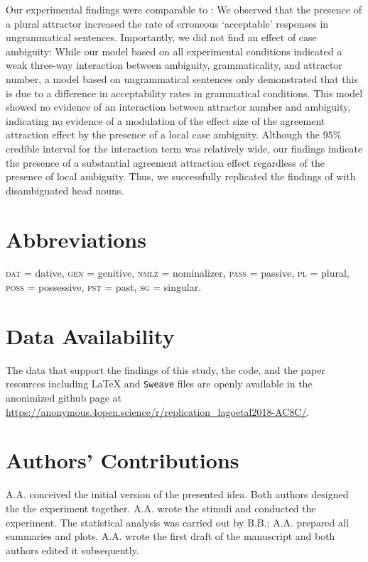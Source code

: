 \documentclass[apacite,linguex]{glossa}\usepackage[]{graphicx}\usepackage[]{color}
\newcommand{\firstauthor}{{A.A.}}
\newcommand{\secondauthor}{{B.B.}}
\begin{document}
Our experimental findings were comparable to \citet{LagoEtAl:2019}: We observed that the presence of a plural attractor increased the rate of erroneous `acceptable' responses  
in ungrammatical sentences.
Importantly, we did not find an effect of case ambiguity: While our model based on all experimental conditions indicated a weak three-way interaction between ambiguity, grammaticality, and attractor number, a model based on ungrammatical sentences only demonstrated that this is due to a difference in acceptability rates in grammatical conditions. This model showed no evidence of an interaction between attractor number and ambiguity, indicating no evidence of a modulation of the effect size of the agreement attraction effect by the presence of a local case ambiguity. 
Although the $95\%$ credible interval for the interaction term was relatively wide, our findings indicate the presence of a substantial agreement attraction effect regardless of the presence of local ambiguity.
Thus, we successfully replicated the findings of \citet{LagoEtAl:2019} with disambiguated head nouns. 


\section*{Abbreviations} %


\textsc{dat} = dative, \textsc{gen} = genitive, \textsc{nmlz} = nominalizer, \textsc{pass} = passive, \textsc{pl} = plural, \textsc{poss} = possessive, \textsc{pst} = past, \textsc{sg} = singular. %


\section*{Data Availability} %


The data that support the findings of this study, the code, and the paper resources including \LaTeX{} and \texttt{Sweave} files are openly available in the anonimized github page at \url{https://anonymous.4open.science/r/replication_lagoetal2018-AC8C/}. %


\section*{Authors' Contributions} %


{\firstauthor} conceived the initial version of the presented idea. Both authors designed the the experiment together. 
{\firstauthor} wrote the stimuli and conducted the experiment. The statistical analysis was carried out by {\secondauthor}; {\firstauthor} prepared all summaries and plots. {\firstauthor} wrote the first draft of the manuscript and both authors edited it subsequently. 




\end{document}
